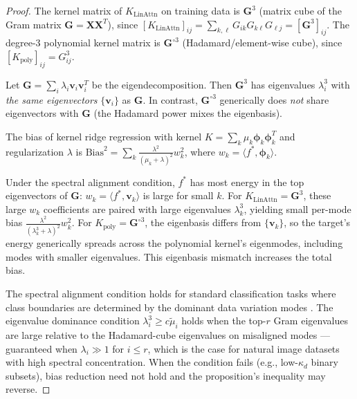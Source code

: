 \documentclass{article}
\theoremstyle{plain}
\theoremstyle{definition}
\theoremstyle{remark}
\begin{document}
\begin{proof}
The kernel matrix of $K_{\text{LinAttn}}$ on training data is $\mathbf{G}^3$ (matrix cube of the Gram matrix $\mathbf{G} = \mathbf{X}\mathbf{X}^T$), since $[K_{\text{LinAttn}}]_{ij} = \sum_{k,\ell} G_{ik}G_{k\ell}G_{\ell j} = [\mathbf{G}^3]_{ij}$. The degree-3 polynomial kernel matrix is $\mathbf{G}^{\circ 3}$ (Hadamard/element-wise cube), since $[K_{\text{poly}}]_{ij} = G_{ij}^3$.

Let $\mathbf{G} = \sum_i \lambda_i \mathbf{v}_i \mathbf{v}_i^T$ be the eigendecomposition. Then $\mathbf{G}^3$ has eigenvalues $\lambda_i^3$ with \emph{the same eigenvectors} $\{\mathbf{v}_i\}$ as $\mathbf{G}$. In contrast, $\mathbf{G}^{\circ 3}$ generically does \emph{not} share eigenvectors with $\mathbf{G}$ (the Hadamard power mixes the eigenbasis).

The bias of kernel ridge regression with kernel $K = \sum_k \mu_k \boldsymbol{\phi}_k \boldsymbol{\phi}_k^T$ and regularization $\lambda$ is $\text{Bias}^2 = \sum_k \frac{\lambda^2}{(\mu_k + \lambda)^2} w_k^2$, where $w_k = \langle f^*, \boldsymbol{\phi}_k \rangle$.

Under the spectral alignment condition, $f^*$ has most energy in the top eigenvectors of $\mathbf{G}$: $w_k = \langle f^*, \mathbf{v}_k \rangle$ is large for small $k$. For $K_{\text{LinAttn}} = \mathbf{G}^3$, these large $w_k$ coefficients are paired with large eigenvalues $\lambda_k^3$, yielding small per-mode bias $\frac{\lambda^2}{(\lambda_k^3 + \lambda)^2} w_k^2$. For $K_{\text{poly}} = \mathbf{G}^{\circ 3}$, the eigenbasis differs from $\{\mathbf{v}_k\}$, so the target's energy generically spreads across the polynomial kernel's eigenmodes, including modes with smaller eigenvalues. This eigenbasis mismatch increases the total bias.

The spectral alignment condition holds for standard classification tasks where class boundaries are determined by the dominant data variation modes \citep{bordelon2020spectrum,canatar2021spectral}. The eigenvalue dominance condition $\lambda_i^3 \geq c\tilde{\mu}_i$ holds when the top-$r$ Gram eigenvalues are large relative to the Hadamard-cube eigenvalues on misaligned modes --- guaranteed when $\lambda_i \gg 1$ for $i \leq r$, which is the case for natural image datasets with high spectral concentration. When the condition fails (e.g., low-$\kappa_d$ binary subsets), bias reduction need not hold and the proposition's inequality may reverse.
\end{proof}
\end{document}

